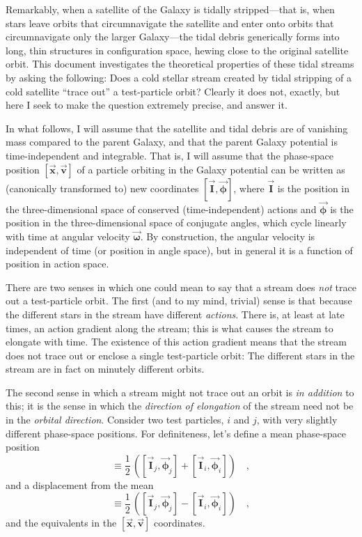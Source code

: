 \documentclass[12pt]{article}
\newcommand{\tvector}[1]{\boldsymbol{\vec{#1}}}
\newcommand{\vx}{\tvector{x}}
\newcommand{\vv}{\tvector{v}}
\newcommand{\vI}{\tvector{I}}
\newcommand{\vphi}{\tvector{\phi}}
\newcommand{\vomega}{\tvector{\omega}}
\begin{document}
Remarkably, when a satellite of the Galaxy is tidally stripped---that
is, when stars leave orbits that circumnavigate the satellite and
enter onto orbits that circumnavigate only the larger Galaxy---the
tidal debris generically forms into long, thin structures in
configuration space, hewing close to the original satellite orbit.
This document investigates the theoretical properties of these tidal
streams by asking the following: Does a cold stellar stream created by
tidal stripping of a cold satellite ``trace out'' a test-particle
orbit?  Clearly it does not, exactly, but here I seek to make the
question extremely precise, and answer it.

In what follows, I will assume that the satellite and tidal debris are
of vanishing mass compared to the parent Galaxy, and that the parent
Galaxy potential is time-independent and integrable.  That is, I will
assume that the phase-space position $[\vx,\vv]$ of a particle
orbiting in the Galaxy potential can be written as (canonically
transformed to) new coordinates $[\vI,\vphi]$, where $\vI$ is the
position in the three-dimensional space of conserved
(time-independent) actions and $\vphi$ is the position in the
three-dimensional space of conjugate angles, which cycle linearly with
time at angular velocity $\vomega$.  By construction, the angular
velocity is independent of time (or position in angle space), but in
general it is a function of position in action space.

There are two senses in which one could mean to say that a stream does
\emph{not} trace out a test-particle orbit.  The first (and to my
mind, trivial) sense is that because the different stars in the stream
have different \emph{actions}.  There is, at least at late times, an
action gradient along the stream; this is what causes the stream to
elongate with time.  The existence of this action gradient means that
the stream does not trace out or enclose a single test-particle orbit:
The different stars in the stream are in fact on minutely different
orbits.

The second sense in which a stream might not trace out an orbit is
\emph{in addition} to this; it is the sense in which the
\emph{direction of elongation} of the stream need not be in the
\emph{orbital direction}.  Consider two test particles, $i$ and $j$,
with very slightly different phase-space positions.  For definiteness,
let's define a mean phase-space position
\begin{equation}
[\vI,\vphi] \equiv \frac{1}{2}
 \,\left([\vI_j,\vphi_j] + [\vI_i,\vphi_i]\right) \quad ,
\end{equation}
and a displacement from the mean
\begin{equation}
[\delta\vI,\delta\vphi] \equiv \frac{1}{2}
 \,\left([\vI_j,\vphi_j] - [\vI_i,\vphi_i]\right) \quad ,
\end{equation}
and the equivalents in the $[\vx,\vv]$ coordinates.
\end{document}
